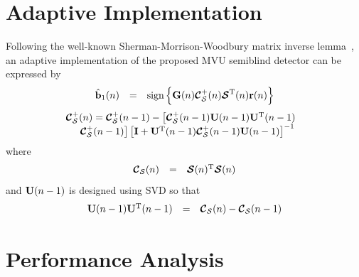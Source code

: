 \documentclass[a4paper,10pt,fleqn, twocolumn]{IEEETran}
\newcommand{\br}{{\mathbf r}}
\newcommand{\bb}{{\bf b}}
\newcommand{\bG}{{\bf G}}
\newcommand{\bI}{{\bf I}}
\newcommand{\bU}{{\bf U}}
\newcommand{\bcC}{{\mbox {\boldmath ${\cal C}$}}}
\newcommand{\bcS}{{\mbox {\boldmath ${\cal S}$}}}
\begin{document}
\section{Adaptive Implementation}
Following the well-known Sherman-Morrison-Woodbury matrix inverse
lemma~\cite{Golu96}, an adaptive implementation of  the proposed
MVU semiblind detector can be expressed by
\begin{equation}\hspace{-0.0in}
\begin{array}{rcl}
\hat{\bb}_1(n)&=&\mbox{sign}\left\{\bG(n)\bcC_{\cal
S}^{+}(n)\bcS^{\rm T}(n)\br(n)\right\}
\end{array}
\end{equation}
\begin{equation}\hspace{-0.1in}
\begin{array}{l}
\bcC_{\cal S}^{+}(n)=\bcC_{\cal S}^{+}(n-1)-\bigl[\bcC_{\cal
S}^{+}(n-1)\bU(n-1)\bU^{\rm T}(n-1)\\
\hspace{0.2in}\bcC_{\cal S}^{+}(n-1)\bigr]\left[\bI+\bU^{\rm
T}(n-1)\bcC_{\cal S}^{+}(n-1)\bU(n-1)\right]^{-1}
\end{array}\label{adaptiveLS}
\end{equation}
\noindent where
\begin{equation}\hspace{-0.0in}
\begin{array}{rcl}
\bcC_{\cal S}(n)&=&\bcS(n)^{\rm T}\bcS(n)
\end{array}
\end{equation}
 \noindent and $\bU(n-1)$ is designed using SVD so that
\begin{equation}\hspace{-0.00in}
\begin{array}{rcl}
\bU(n-1)\bU^{\rm T}(n-1)&=&\bcC_{\cal S}(n)-\bcC_{\cal S}(n-1)
\end{array}
\end{equation}
\section{Performance Analysis}
\end{document}
